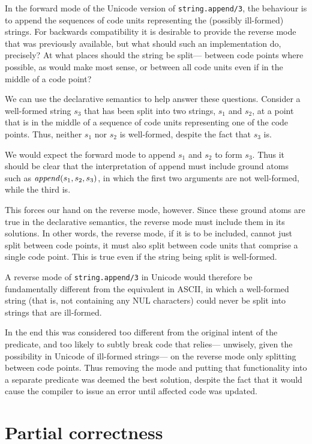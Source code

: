 In the forward mode of the Unicode version of \texttt{string.append/3},
the behaviour is to append the sequences of code units representing
the (possibly ill-formed) strings.
For backwards compatibility it is desirable to provide
the reverse mode that was previously available,
but what should such an implementation do, precisely?
At what places should the string be split---%
between code points where possible, as would make most sense,
or between all code units even if in the middle of a code point?

We can use the declarative semantics to help answer these questions.
Consider a well-formed string $s_3$
that has been split into two strings, $s_1$ and $s_2$,
at a point that is in the middle of
a sequence of code units representing one of the code points.
Thus, neither $s_1$ nor $s_2$ is well-formed,
despite the fact that $s_3$ is.

We would expect the forward mode to append $s_1$ and $s_2$ to form $s_3$.
Thus it should be clear that the interpretation of append
must include ground atoms such as $\text{\textit{append}}(s_1, s_2, s_3)$,
in which the first two arguments are not well-formed,
while the third is.

This forces our hand on the reverse mode, however.
Since these ground atoms are true in the declarative semantics,
the reverse mode must include them in its solutions.
In other words,
the reverse mode, if it is to be included,
cannot just split between code points,
it must also split between
code units that comprise a single code point.
This is true even if the string being split is well-formed.

A reverse mode of \texttt{string.append/3} in Unicode
would therefore be fundamentally different from
the equivalent in ASCII,
in which a well-formed string
(that is, not containing any NUL characters)
could never be split into strings that are ill-formed.

In the end this was considered
too different from the original intent of the predicate,
and too likely to subtly break code that relies---%
unwisely, given the possibility in Unicode of ill-formed strings---%
on the reverse mode only splitting between code points.
Thus removing the mode
and putting that functionality into a separate predicate
was deemed the best solution,
despite the fact that
it would cause the compiler to issue an error
until affected code was updated.


\section{Partial correctness}
\label{sec:partial-correctness}

